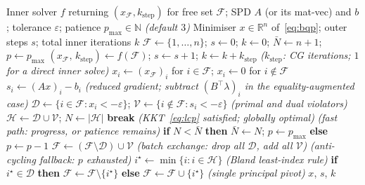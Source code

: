\begin{algorithm}[ht]
\caption{Active-set outer loop (wraps the CG inner solver $f$)}\label{alg:elim}
\begin{algorithmic}[1]
\Require Inner solver $f$ returning $(x_{\mathcal{F}}, k_{\mathrm{step}})$ for free set $\mathcal{F}$;\;
         SPD $A$ (or its mat-vec) and $b$;\; tolerance $\varepsilon$;\;
         patience $p_{\max} \in \mathbb{N}$ \textit{(default $3$)}
\Ensure Minimiser $x \in \mathbb{R}^n$ of~\eqref{eq:bqp};\; outer steps $s$;\; total inner iterations $k$
\State $\mathcal{F} \leftarrow \{1,\ldots,n\}$;\; $s \leftarrow 0$;\; $k \leftarrow 0$;\;
       $\bar N \leftarrow n+1$;\; $p \leftarrow p_{\max}$
\Loop
  \State $(x_{\mathcal{F}},\, k_{\mathrm{step}}) \leftarrow f(\mathcal{F})$;\;
         $s \leftarrow s + 1$;\; $k \leftarrow k + k_{\mathrm{step}}$
    \hfill\textit{($k_{\mathrm{step}}$: CG iterations; $1$ for a direct inner solve)}
  \State $x_i \leftarrow (x_{\mathcal{F}})_i$ for $i \in \mathcal{F}$;\; $x_i \leftarrow 0$ for $i \notin \mathcal{F}$
  \State $s_i \leftarrow (Ax)_i - b_i$
    \hfill\textit{(reduced gradient; subtract $(B^\top\lambda)_i$ in the equality-augmented case)}
  \State $\mathcal{D} \leftarrow \{i \in \mathcal{F} : x_i < -\varepsilon\}$;\;
         $\mathcal{V} \leftarrow \{i \notin \mathcal{F} : s_i < -\varepsilon\}$
    \hfill\textit{(primal and dual violators)}
  \State $\mathcal{H} \leftarrow \mathcal{D} \cup \mathcal{V}$;\; $N \leftarrow |\mathcal{H}|$
    \State \textbf{break} \hfill\textit{(KKT~\eqref{eq:lcp} satisfied; globally optimal)}
    \hfill\textit{(fast path: progress, or patience remains)}
    \State \textbf{if} $N < \bar N$ \textbf{ then } $\bar N \leftarrow N$;\; $p \leftarrow p_{\max}$ \textbf{ else } $p \leftarrow p - 1$
    \State $\mathcal{F} \leftarrow (\mathcal{F} \setminus \mathcal{D}) \cup \mathcal{V}$
      \hfill\textit{(batch exchange: drop all $\mathcal{D}$, add all $\mathcal{V}$)}
  \Else
    \hfill\textit{(anti-cycling fallback: $p$ exhausted)}
    \State $i^\star \leftarrow \min\{i : i \in \mathcal{H}\}$
      \hfill\textit{(Bland least-index rule)}
    \State \textbf{if} $i^\star \in \mathcal{D}$ \textbf{ then } $\mathcal{F} \leftarrow \mathcal{F} \setminus \{i^\star\}$
           \textbf{ else } $\mathcal{F} \leftarrow \mathcal{F} \cup \{i^\star\}$
      \hfill\textit{(single principal pivot)}
  \EndIf
\EndLoop
\State \Return $x$, $s$, $k$
\end{algorithmic}
\end{algorithm}

